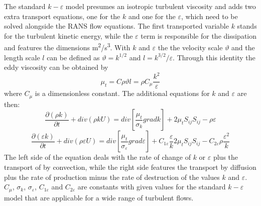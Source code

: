 The standard $k-\varepsilon$ model presumes an isotropic turbulent viscosity and adds two extra transport equations, one for the $k$ and one for the $\varepsilon$, which need to be solved alongside the RANS flow equations.
The first transported variable $k$ stands for the turbulent kinetic energy, while the $\varepsilon$ term is responsible for the dissipation and features the dimensions m\textsuperscript{2}/s\textsuperscript{3}.
With $k$ and $\varepsilon$ the the velocity scale $\vartheta$ and the length scale $l$ can be defined as $\vartheta = k^{1/2}$ and $l = k^{3/2}/\varepsilon$. Through this identity the eddy viscosity can be obtained by
\begin{equation}
\mu_t = C \rho \vartheta l = \rho C_{\mu} \frac{k^2}{\varepsilon}
\end{equation}
where $C_{\mu}$ is a dimensionless constant. The additional equations for $k$ and $\varepsilon$ are then:
\begin{equation}
\frac{\partial(\rho k)}{\partial t} + div(\rho k U) = div \left[ \frac{\mu_t}{\sigma_k} grad k \right] + 2 \mu_t S_{ij} S_{ij} - \rho \varepsilon
\end{equation}
\begin{equation}
\frac{\partial(\varepsilon k)}{\partial t} + div(\rho \varepsilon U) = div \left[ \frac{\mu_t}{\sigma_{\varepsilon}} grad \varepsilon \right] + C_{1\varepsilon} \frac{\varepsilon}{k} 2 \mu_t S_{ij} S_{ij} - C_{2\varepsilon} \rho \frac{\varepsilon^2}{k}
\end{equation}
The left side of the equation deals with the rate of change of $k$ or $\varepsilon$ plus the transport of by convection, while the right side features the transport by diffusion plus the rate of production minus the rate of destruction of the values $k$ and $\varepsilon$.
$C_{\mu}$, $\sigma_k$, $\sigma_{\varepsilon}$, $C_{1\varepsilon}$ and $C_{2\varepsilon}$ are constants with given values for the standard $k-\varepsilon$ model that are applicable for a wide range of turbulent flows.

